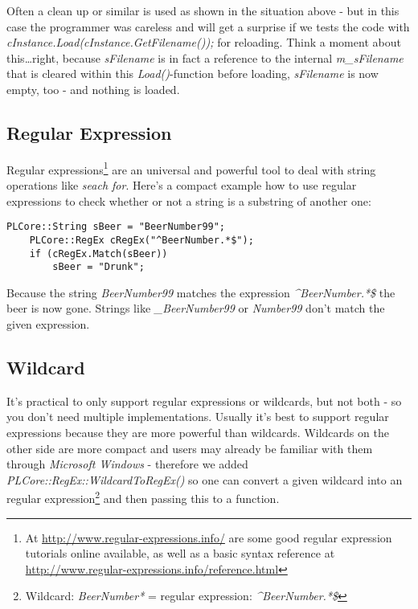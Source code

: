 Often a clean up or similar is used as shown in the situation above - but in this case the programmer was careless and will get a surprise if we tests the code with \emph{cInstance.Load(cInstance.GetFilename());} for reloading. Think a moment about this\ldots right, because \emph{sFilename} is in fact a reference to the internal \emph{m\_sFilename} that is cleared within this \emph{Load()}-function before loading, \emph{sFilename} is now empty, too - and nothing is loaded.




\subsection{Regular Expression}
Regular expressions\footnote{At \url{http://www.regular-expressions.info/} are some good regular expression tutorials online available, as well as a basic syntax reference at \url{http://www.regular-expressions.info/reference.html}} are an universal and powerful tool to deal with string operations like \emph{seach for}. Here's a compact example how to use regular expressions to check whether or not a string is a substring of another one:

\begin{lstlisting}[caption=Regular expression example]
	PLCore::String sBeer = "BeerNumber99";
	PLCore::RegEx cRegEx("^BeerNumber.*$");
	if (cRegEx.Match(sBeer))
		sBeer = "Drunk";
\end{lstlisting}

Because the string \emph{BeerNumber99} matches the expression \emph{\textasciicircum BeerNumber.*\$} the beer is now gone. Strings like \emph{\_BeerNumber99} or \emph{Number99} don't match the given expression.




\subsection{Wildcard}
It's practical to only support regular expressions or wildcards, but not both - so you don't need multiple implementations. Usually it's best to support regular expressions because they are more powerful than wildcards. Wildcards on the other side are more compact and users may already be familiar with them through \emph{Microsoft Windows} - therefore we added \emph{PLCore::RegEx::WildcardToRegEx()} so one can convert a given wildcard into an regular expression\footnote{Wildcard: \emph{BeerNumber*} = regular expression: \emph{\textasciicircum BeerNumber.*\$}} and then passing this to a function.




